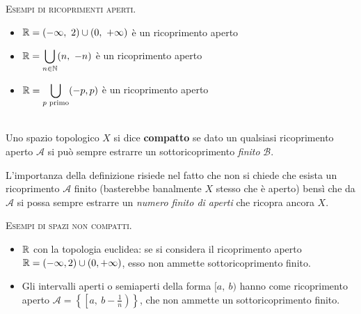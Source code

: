 \begin{examples}\textsc{Esempi di ricoprimenti aperti.}
	\begin{itemize}
		\item $\displaystyle \realset=(-\infty ,\ 2)\cup(0,\ +\infty)$ è un ricoprimento aperto
		\item $\displaystyle \mathbb{R} =\mathop{{\bigcup}}\displaylimits_{n\in\mathbb{N}}(n,\ -n)$ è un ricoprimento aperto
		\item $\displaystyle \mathbb{R}=\mathop{{\bigcup}}\displaylimits_{p \text{ primo}}(-p,p)$ è un ricoprimento aperto
	\end{itemize}
\end{examples}

\begin{define}~{}\\
	Uno spazio topologico $X$ si dice \textbf{compatto} se dato un qualsiasi ricoprimento aperto $\mathcal{A}$ si può sempre estrarre un sottoricoprimento \textit{finito} $\mathcal{B}$.
\end{define}
L'importanza della definizione risiede nel fatto che non si chiede che esista un ricoprimento $\mathcal{A}$ finito (basterebbe banalmente $X$ stesso che è aperto) bensì che da $\mathcal{A}$ si possa sempre estrarre un \textit{numero finito di aperti} che ricopra ancora $X$.

\begin{examples}\textsc{Esempi di spazi non compatti.}
	\begin{itemize}
		\item $\mathbb{R}$ con la topologia euclidea: se si considera il ricoprimento aperto $\displaystyle \mathbb{R}=(-\infty , 2)\cup(0,+\infty)$, esso non ammette sottoricoprimento finito.
		\item Gli intervalli aperti o semiaperti della forma $[a,\ b)$ hanno come ricoprimento aperto $\mathcal{A}=\left\{ \left[ a, \ b-\frac{1}{n}\right) \right\}$, che non ammette un sottoricoprimento finito.
	\end{itemize}
\end{examples}

